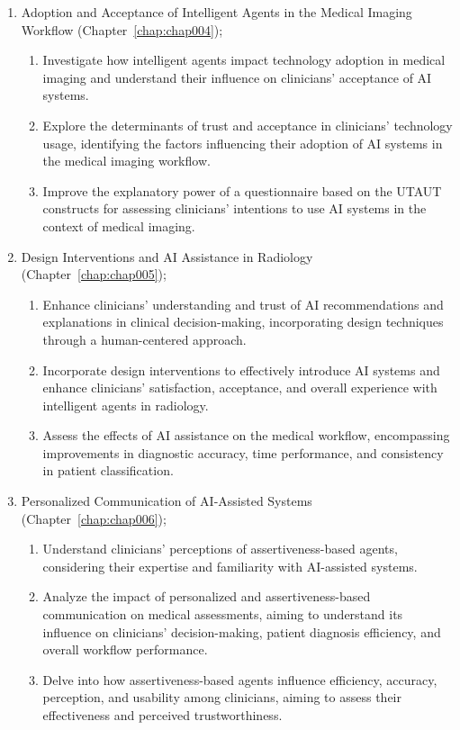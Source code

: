 \begin{enumerate}
\item Adoption and Acceptance of Intelligent Agents in the Medical Imaging Workflow (Chapter~\ref{chap:chap004});
\begin{enumerate}[label*=\arabic*.]
\item Investigate how intelligent agents impact technology adoption in medical imaging and understand their influence on clinicians' acceptance of \ac{AI} systems.
\item Explore the determinants of trust and acceptance in clinicians' technology usage, identifying the factors influencing their adoption of \ac{AI} systems in the medical imaging workflow.
\item Improve the explanatory power of a questionnaire based on the \ac{UTAUT} constructs for assessing clinicians' intentions to use \ac{AI} systems in the context of medical imaging.
\end{enumerate}
\item Design Interventions and \ac{AI} Assistance in Radiology (Chapter~\ref{chap:chap005});
\begin{enumerate}[label*=\arabic*.]
\item Enhance clinicians' understanding and trust of \ac{AI} recommendations and explanations in clinical decision-making, incorporating design techniques through a human-centered approach.
\item Incorporate design interventions to effectively introduce \ac{AI} systems and enhance clinicians' satisfaction, acceptance, and overall experience with intelligent agents in radiology.
\item Assess the effects of \ac{AI} assistance on the medical workflow, encompassing improvements in diagnostic accuracy, time performance, and consistency in patient classification.
\end{enumerate}
\item Personalized Communication of \ac{AI}-Assisted Systems (Chapter~\ref{chap:chap006});
\begin{enumerate}[label*=\arabic*.]
\item Understand clinicians' perceptions of assertiveness-based agents, considering their expertise and familiarity with \ac{AI}-assisted systems.
\item Analyze the impact of personalized and assertiveness-based communication on medical assessments, aiming to understand its influence on clinicians' decision-making, patient diagnosis efficiency, and overall workflow performance.
\item Delve into how assertiveness-based agents influence efficiency, accuracy, perception, and usability among clinicians, aiming to assess their effectiveness and perceived trustworthiness.
\end{enumerate}
\end{enumerate}

